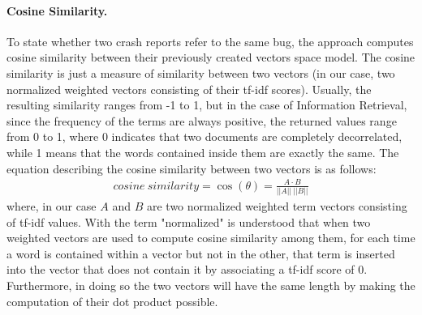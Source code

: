 \paragraph{Cosine Similarity.}
\label{sec:cosine_similarity}
To state whether two crash reports refer to the same bug, the approach computes cosine similarity between their previously created vectors space model. 
The cosine similarity is just a measure of similarity between two vectors \cite{cosine} (in our case, two normalized weighted vectors consisting of their tf-idf scores).
Usually, the resulting similarity ranges from -1 to 1, but in the case of Information Retrieval, since the frequency of the terms are always positive, the returned values range from 0 to 1, where 0 indicates that two documents are completely decorrelated, while 1 means that the words contained inside them are exactly the same.  
The equation describing the cosine similarity between two vectors is as follows: 
\begin{align*}
cosine\:similarity = \cos({\theta}) = \frac{A\cdot{B}}{||A||\:||B||}
\end{align*}
where, in our case $A$ and $B$ are two normalized weighted term vectors consisting of tf-idf values. 
With the term "normalized" is understood that when two weighted vectors are used to compute cosine similarity among them, for each time a word is contained within a vector but not in the other, that term is inserted into the vector that does not contain it by associating a tf-idf score of 0. Furthermore, in doing so the two vectors will have the same length by making the computation of their dot product possible. 



